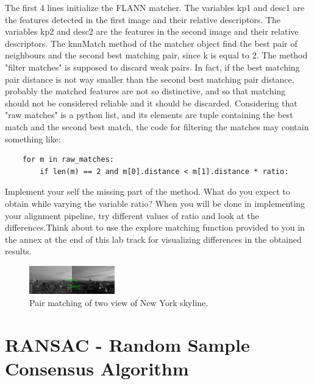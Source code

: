 \documentclass[aps,letterpaper,10pt]{revtex4}
\begin{document}
\vspace{3mm}
The first 4 lines initialize the FLANN matcher. The variables kp1 and desc1 are the features detected in the first image and their relative descriptors. The variables kp2 and desc2 are the features in the second image and their relative descriptors. The knnMatch method of the matcher object find the best pair of neighbours and the second best matching pair, since k is equal to 2. The method "filter matches" is supposed to discard weak pairs. In fact, if the best matching pair distance is not way smaller than the second best matching pair distance, probably the matched features are not so distinctive, and so that matching should not be considered reliable and it should be discarded. Considering that "raw matches" is a python list, and its elements are tuple containing the best match and the second best match, the code for filtering the matches may contain something like:
\begin{lstlisting}
    for m in raw_matches:
        if len(m) == 2 and m[0].distance < m[1].distance * ratio:
\end{lstlisting}
Implement your self the missing part of the method. What do you expect to obtain while varying the variable ratio? When you will be done in implementing your alignment pipeline, try different values of ratio and look at the differences.Think about to use the explore matching function provided to you in the annex at the end of this lab track for visualizing differences in the obtained results.

\begin{figure}[h]
	\begin{center}
		\includegraphics[width=0.33\textwidth]{imgs/correspondences_rockfeller_landscape.png}
	\end{center}
\caption{Pair matching of two view of New York skyline.}
\end{figure}

\section{RANSAC - Random Sample Consensus Algorithm}
\end{document}
